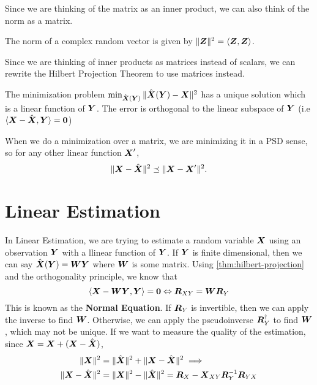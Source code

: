 Since we are thinking of the matrix as an inner product, we can also think of the norm as a matrix.
\begin{definition}
	The norm of a complex random vector is given by $\|\boldsymbol{Z}\|^2 = \langle \boldsymbol{Z}, \boldsymbol{Z} \rangle$.
	\label{defn:norm}
\end{definition}
Since we are thinking of inner products as matrices instead of scalars, we can rewrite the Hilbert Projection Theorem to use matrices instead.
\begin{theorem}
	The minimization problem $\min_{\hat{\boldsymbol{X}}(\boldsymbol{Y})}\|\hat{\boldsymbol{X}}(\boldsymbol{Y}) - \boldsymbol{X}\|^2$ has a unique solution which is a linear function of $\boldsymbol{Y}$. The error is orthogonal to the linear subspace of $\boldsymbol{Y}$ (i.e $\langle \boldsymbol{X} - \hat{\boldsymbol{X}}, \boldsymbol{Y} \rangle = \boldsymbol{0}$)
	\label{thm:hilbert-projection}
\end{theorem}
When we do a minimization over a matrix, we are minimizing it in a PSD sense, so for any other linear function $\boldsymbol{X}'$, \[
	\|\boldsymbol{X}-\hat{\boldsymbol{X}}\|^2  \preceq \|\boldsymbol{X} - \boldsymbol{X}'\|^2.
\]
\section{Linear Estimation}
In Linear Estimation, we are trying to estimate a random variable $\boldsymbol{X}$ using an observation $\boldsymbol{Y}$ with a llinear function of $\boldsymbol{Y}$.
If $\boldsymbol{Y}$ is finite dimensional, then we can say $\hat{\boldsymbol{X}}(\boldsymbol{Y}) = \boldsymbol{W}\boldsymbol{Y}$ where $\boldsymbol{W}$ is some matrix.
Using \cref{thm:hilbert-projection} and the orthogonality principle, we know that
\[
	\langle \boldsymbol{X}-\boldsymbol{W}\boldsymbol{Y}, \boldsymbol{Y} \rangle = \boldsymbol{0} \Leftrightarrow \boldsymbol{R}_{XY} = \boldsymbol{W}\boldsymbol{R}_Y
\]
This is known as the \textbf{Normal Equation}.
If $\boldsymbol{R}_Y$ is invertible, then we can apply the inverse to find $\boldsymbol{W}$.
Otherwise, we can apply the pseudoinverse $\boldsymbol{R}_Y^\dagger$ to find $\boldsymbol{W}$, which may not be unique.
If we want to measure the quality of the estimation, since $\boldsymbol{X} = \boldsymbol{X}+(\boldsymbol{X}-\hat{\boldsymbol{X}})$,
\begin{align*}
	\|\boldsymbol{X}\|^2 &= \|\hat{\boldsymbol{X}}\|^2 + \|\boldsymbol{X} - \hat{\boldsymbol{X}}\|^2 \implies \\
	\|\boldsymbol{X}-\hat{\boldsymbol{X}}\|^2 &= \|\boldsymbol{X}\|^2 - \|\hat{\boldsymbol{X}}\|^2 = \boldsymbol{R}_X - \boldsymbol{X}_{XY}\boldsymbol{R}_Y^{-1}\boldsymbol{R}_{YX}
\end{align*}


